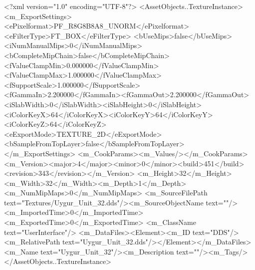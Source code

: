 <?xml version="1.0" encoding="UTF-8"?>
<AssetObjects..TextureInstance>
  <m_ExportSettings>
    <ePixelformat>PF_R8G8B8A8_UNORM</ePixelformat><eFilterType>FT_BOX</eFilterType>
    <bUseMips>false</bUseMips><iNumManualMips>0</iNumManualMips><bCompleteMipChain>false</bCompleteMipChain>
    <fValueClampMin>0.000000</fValueClampMin><fValueClampMax>1.000000</fValueClampMax><fSupportScale>1.000000</fSupportScale>
    <fGammaIn>2.200000</fGammaIn><fGammaOut>2.200000</fGammaOut><iSlabWidth>0</iSlabWidth><iSlabHeight>0</iSlabHeight>
    <iColorKeyX>64</iColorKeyX><iColorKeyY>64</iColorKeyY><iColorKeyZ>64</iColorKeyZ>
    <eExportMode>TEXTURE_2D</eExportMode><bSampleFromTopLayer>false</bSampleFromTopLayer>
  </m_ExportSettings>
  <m_CookParams><m_Values/></m_CookParams>
  <m_Version><major>4</major><minor>0</minor><build>451</build><revision>343</revision></m_Version>
  <m_Height>32</m_Height><m_Width>32</m_Width><m_Depth>1</m_Depth><m_NumMipMaps>0</m_NumMipMaps>
  <m_SourceFilePath text="Textures/Uygur_Unit_32.dds"/><m_SourceObjectName text=""/>
  <m_ImportedTime>0</m_ImportedTime><m_ExportedTime>0</m_ExportedTime>
  <m_ClassName text="UserInterface"/>
  <m_DataFiles><Element><m_ID text="DDS"/><m_RelativePath text="Uygur_Unit_32.dds"/></Element></m_DataFiles>
  <m_Name text="Uygur_Unit_32"/><m_Description text=""/><m_Tags/>
</AssetObjects..TextureInstance>

